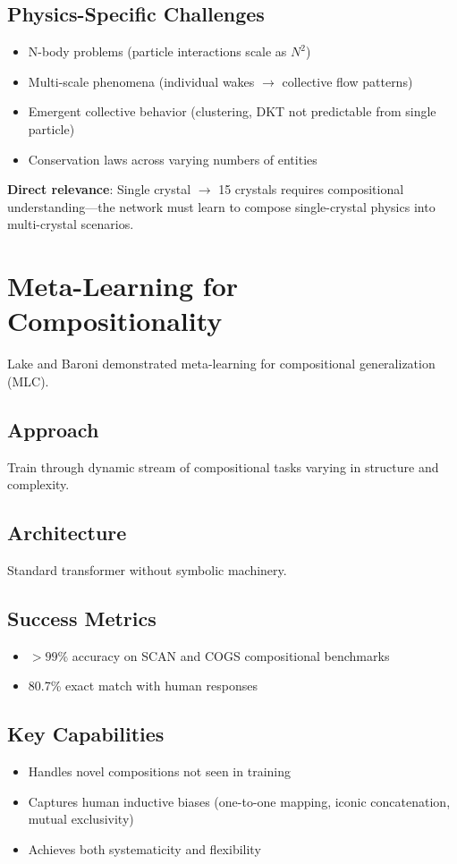 \subsection{Physics-Specific Challenges}
\begin{itemize}
    \item N-body problems (particle interactions scale as $N^2$)
    \item Multi-scale phenomena (individual wakes $\rightarrow$ collective flow patterns)
    \item Emergent collective behavior (clustering, DKT not predictable from single particle)
    \item Conservation laws across varying numbers of entities
\end{itemize}

\textbf{Direct relevance}: Single crystal $\rightarrow$ 15 crystals requires compositional understanding---the network must learn to compose single-crystal physics into multi-crystal scenarios.

\section{Meta-Learning for Compositionality}

Lake and Baroni \cite{lake2023} demonstrated meta-learning for compositional generalization (MLC).

\subsection{Approach}
Train through dynamic stream of compositional tasks varying in structure and complexity.

\subsection{Architecture}
Standard transformer without symbolic machinery.

\subsection{Success Metrics}
\begin{itemize}
    \item $>99\%$ accuracy on SCAN and COGS compositional benchmarks
    \item 80.7\% exact match with human responses
\end{itemize}

\subsection{Key Capabilities}
\begin{itemize}
    \item Handles novel compositions not seen in training
    \item Captures human inductive biases (one-to-one mapping, iconic concatenation, mutual exclusivity)
    \item Achieves both systematicity and flexibility
\end{itemize}

